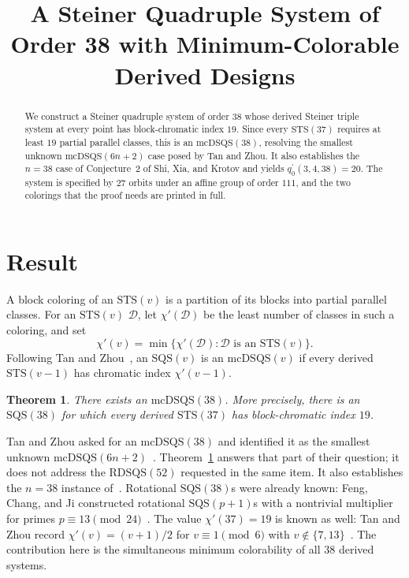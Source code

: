 \documentclass[11pt]{amsart}
\title[An \texorpdfstring{$\mcDSQS(38)$}{mcDSQS(38)}]
{A Steiner Quadruple System of Order 38 with Minimum-Colorable Derived Designs}
\date{}
\newtheorem{theorem}{Theorem}
\newcommand{\STS}{\mathrm{STS}}
\newcommand{\SQS}{\mathrm{SQS}}
\newcommand{\mcDSQS}{\mathrm{mcDSQS}}
\begin{document}
\begin{abstract}
We construct a Steiner quadruple system of order $38$ whose derived
Steiner triple system at every point has block-chromatic index $19$.
Since every $\STS(37)$ requires at least $19$ partial parallel classes,
this is an $\mcDSQS(38)$, resolving the smallest unknown
$\mcDSQS(6n+2)$ case posed by Tan and Zhou. It also establishes the
$n=38$ case of Conjecture~2 of Shi, Xia, and Krotov and yields
$q^{\prime}_{0}(3,4,38)=20$. The system is specified by $27$ orbits
under an affine group of order $111$, and the two colorings that the
proof needs are printed in full.
\end{abstract}

\maketitle

\section{Result}

A block coloring of an $\STS(v)$ is a partition of its blocks into
partial parallel classes. For an $\STS(v)$ $\mathcal D$, let
$\chi'(\mathcal D)$ be the least number of classes in such a coloring,
and set
\[
\chi'(v)=\min\{\chi'(\mathcal D):\mathcal D\text{ is an }\STS(v)\}.
\]
Following Tan and Zhou~\cite{TanZhou}, an $\SQS(v)$ is an
$\mcDSQS(v)$ if every derived $\STS(v-1)$ has chromatic index
$\chi'(v-1)$.

\begin{theorem}\label{thm:main}
There exists an $\mcDSQS(38)$. More precisely, there is an $\SQS(38)$
for which every derived $\STS(37)$ has block-chromatic index $19$.
\end{theorem}

Tan and Zhou asked for an $\mcDSQS(38)$ and identified it as the
smallest unknown $\mcDSQS(6n+2)$~\cite[Sec.~4, item~(1)]{TanZhou}.
Theorem~\ref{thm:main} answers that part of their question; it does not
address the $\mathrm{RDSQS}(52)$ requested in the same item. It also
establishes the $n=38$ instance of~\cite[Conj.~2]{ShiXiaKrotov}.
Rotational $\SQS(38)$s were already known: Feng, Chang, and Ji
constructed rotational $\SQS(p+1)$s with a nontrivial multiplier for
primes $p\equiv13\pmod{24}$~\cite{FengChangJi}. The value
$\chi'(37)=19$ is known as well: Tan and Zhou record
$\chi'(v)=(v+1)/2$ for $v\equiv1\pmod{6}$ with
$v\notin\{7,13\}$~\cite{TanZhou}. The contribution here
is the simultaneous minimum colorability of all $38$ derived systems.
\end{document}

